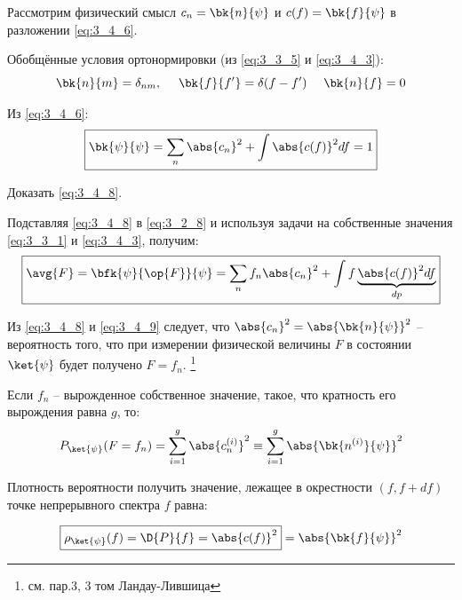 Рассмотрим физический смысл $c_n = \bk{n}{\psi}$ и $c(f) = \bk{f}{\psi}$ в разложении \eqref{eq:3_4_6}.

Обобщённые условия ортонормировки (из \eqref{eq:3_3_5} и \eqref{eq:3_4_3}):
$$
\bk{n}{m} = \delta_{nm}, ~~~~ \bk{f}{f'} = \delta(f - f') ~~~~ \bk{n}{f} = 0
$$

Из \eqref{eq:3_4_6}:
\begin{equation}
\label{eq:3_4_8}
\boxed {
	\bk{\psi}{\psi} = \sum_n \abs{c_n}^2 + \int \abs{c(f)}^2 df = 1
}
\end{equation}

\begin{excr}
Доказать \eqref{eq:3_4_8}.
\end{excr}

Подставляя \eqref{eq:3_4_8} в \eqref{eq:3_2_8} и используя задачи на собственные значения \eqref{eq:3_3_1} и \eqref{eq:3_4_3}, получим:
\begin{equation}
\label{eq:3_4_9}
\boxed {
	\avg{F} = \bfk{\psi}{\op{F}}{\psi} = \sum_n f_n \abs{c_n}^2 + \int f \underbrace{\abs{c(f)}^2 df}_{dp}
}
\end{equation}

Из \eqref{eq:3_4_8} и \eqref{eq:3_4_9} следует, что $\abs{c_n}^2 = \abs{\bk{n}{\psi}}^2$ -- вероятность того, что при измерении физической величины $F$ в состоянии $\ket{\psi}$ будет получено $F = f_n$. \footnote{см. пар.3, 3 том Ландау-Лившица}

Если $f_n$ -- вырожденное собственное значение, такое, что кратность его вырождения равна $g$, то:
\begin{equation}
\label{eq:3_4_10}
P_{\ket{\psi}}(F = f_n) = \sum_{i=1}^{g} \abs{c_n^{(i)}}^2 \equiv \sum_{i=1}^{g} \abs{ \bk{n^{(i)}}{\psi} }^2
\end{equation}

Плотность вероятности получить значение, лежащее в окрестности $(f, f + df)$ точке непрерывного спектра $f$ равна:

\begin{equation}
\label{eq:3_4_11}
\boxed {
	\rho_{\ket{\psi}}(f) = \D{P}{f} = \abs{c(f)}^2
} = \abs{\bk{f}{\psi}}^2
\end{equation}